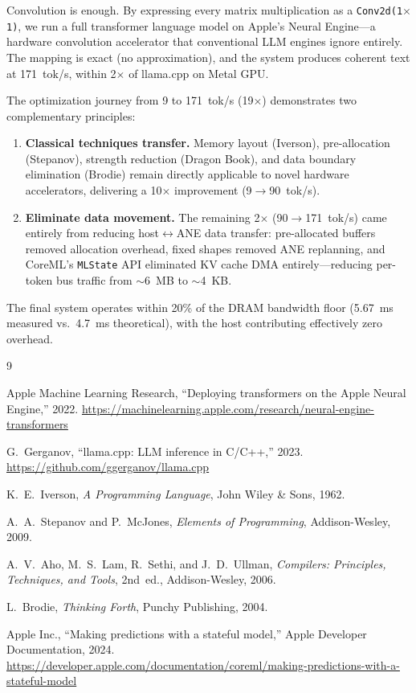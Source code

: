 \documentclass[11pt,twocolumn]{article}
\begin{document}
Convolution is enough. By expressing every matrix multiplication as a
\texttt{Conv2d(1$\times$1)}, we run a full transformer language model
on Apple's Neural Engine---a hardware convolution accelerator that
conventional LLM engines ignore entirely. The mapping is exact (no
approximation), and the system produces coherent text at 171~tok/s,
within 2$\times$ of llama.cpp on Metal GPU.

The optimization journey from 9 to 171~tok/s (19$\times$) demonstrates
two complementary principles:
\begin{enumerate}
\item \textbf{Classical techniques transfer.} Memory layout (Iverson),
  pre-allocation (Stepanov), strength reduction (Dragon Book), and
  data boundary elimination (Brodie) remain directly applicable to
  novel hardware accelerators, delivering a 10$\times$ improvement
  (9$\to$90~tok/s).
\item \textbf{Eliminate data movement.} The remaining 2$\times$
  (90$\to$171~tok/s) came entirely from reducing host$\leftrightarrow$ANE
  data transfer: pre-allocated buffers removed allocation overhead,
  fixed shapes removed ANE replanning, and CoreML's \texttt{MLState}
  API eliminated KV cache DMA entirely---reducing per-token bus
  traffic from $\sim$6~MB to $\sim$4~KB.
\end{enumerate}

The final system operates within 20\% of the DRAM bandwidth floor
(5.67~ms measured vs.\ 4.7~ms theoretical), with the host contributing
effectively zero overhead.


\begin{thebibliography}{9}

Apple Machine Learning Research, ``Deploying transformers on the Apple
Neural Engine,'' 2022.
\url{https://machinelearning.apple.com/research/neural-engine-transformers}

G.~Gerganov, ``llama.cpp: LLM inference in C/C++,'' 2023.
\url{https://github.com/ggerganov/llama.cpp}

K.~E.~Iverson, \emph{A Programming Language}, John Wiley \& Sons, 1962.

A.~A.~Stepanov and P.~McJones, \emph{Elements of Programming},
Addison-Wesley, 2009.

A.~V.~Aho, M.~S.~Lam, R.~Sethi, and J.~D.~Ullman, \emph{Compilers:
Principles, Techniques, and Tools}, 2nd~ed., Addison-Wesley, 2006.

L.~Brodie, \emph{Thinking Forth}, Punchy Publishing, 2004.

Apple Inc., ``Making predictions with a stateful model,''
Apple Developer Documentation, 2024.
\url{https://developer.apple.com/documentation/coreml/making-predictions-with-a-stateful-model}
\end{thebibliography}
\end{document}

